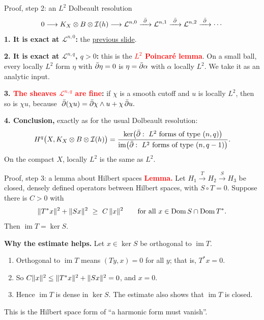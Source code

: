 \begin{frame}{Proof, step 2: an \(L^2\) Dolbeault resolution}
\label{fr:nadel-step2}
\[
0\longrightarrow K_X\otimes B\otimes\cI(h)
\longrightarrow\mathcal L^{n,0}\xrightarrow{\ \db\ }\mathcal L^{n,1}
\xrightarrow{\ \db\ }\mathcal L^{n,2}\xrightarrow{\ \db\ }\cdots
\]
\textbf{1. It is exact at \(\mathcal L^{n,0}\):} the \hyperlink{fr:nadel-step1}{previous slide}.
\par
\textbf{2. It is exact at \(\mathcal L^{n,q}\), \(q>0\):} this is the \textcolor{red}{\textbf{\(L^2\) Poincaré lemma}}. On a small ball, every locally \(L^2\) form \(\eta\) with \(\bar\partial\eta=0\) is \(\eta=\bar\partial\alpha\) with \(\alpha\) locally \(L^2\). We take it as an analytic input.
\par
\textbf{3. \textcolor{red}{The sheaves \(\mathcal L^{n,q}\) are fine}:} if \(\chi\) is a smooth cutoff and \(u\) is locally \(L^2\), then so is \(\chi u\), because
\(\ \bar\partial(\chi u)=\bar\partial\chi\wedge u+\chi\,\bar\partial u .\)
\par\medskip
\textbf{4. Conclusion,} exactly as for the usual Dolbeault resolution:
\[
H^q\bigl(X,K_X\otimes B\otimes\mathcal I(h)\bigr)
=\frac{\ker\bigl(\bar\partial:\ L^2\text{ forms of type }(n,q)\bigr)}{\operatorname{im}\bigl(\bar\partial:\ L^2\text{ forms of type }(n,q-1)\bigr)} .
\]
On the compact \(X\), locally \(L^2\) is the same as \(L^2\).
\end{frame}

\begin{frame}{Proof, step 3: a lemma about Hilbert spaces}
\label{fr:nadel-step3}
\textcolor{red}{\textbf{Lemma.}} Let \(H_1\xrightarrow{\ T\ }H_2\xrightarrow{\ S\ }H_3\) be closed, densely defined operators between Hilbert spaces, with \(S\circ T=0\). Suppose there is \(C>0\) with
\[
\norm{T^*x}^2+\norm{Sx}^2\ \ge\ C\,\norm{x}^2
\qquad\text{for all } x\in\operatorname{Dom}S\cap\operatorname{Dom}T^* .
\]
Then \(\operatorname{im}T=\ker S\).
\par\medskip
\textbf{Why the estimate helps.} Let \(x\in\ker S\) be orthogonal to \(\operatorname{im}T\).
\begin{enumerate}
\item Orthogonal to \(\operatorname{im}T\) means \((Ty,x)=0\) for all \(y\); that is, \(T^*x=0\).
\item So \(C\lVert x\rVert^2\le\lVert T^*x\rVert^2+\lVert Sx\rVert^2=0\), and \(x=0\).
\item Hence \(\operatorname{im}T\) is dense in \(\ker S\). The estimate also shows that \(\operatorname{im}T\) is closed.
\end{enumerate}
\par\medskip
This is the Hilbert space form of ``a harmonic form must vanish''.
\end{frame}

